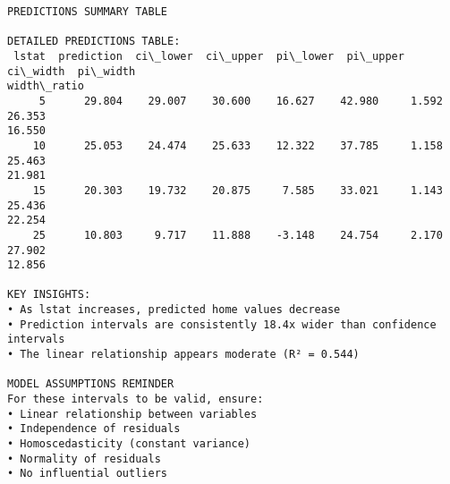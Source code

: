 \documentclass[8pt, twocolumn]{extarticle}
\begin{document}
    \centering
    \begin{Verbatim}[commandchars=\\\{\}]
PREDICTIONS SUMMARY TABLE

DETAILED PREDICTIONS TABLE:
 lstat  prediction  ci\_lower  ci\_upper  pi\_lower  pi\_upper  ci\_width  pi\_width
width\_ratio
     5      29.804    29.007    30.600    16.627    42.980     1.592    26.353
16.550
    10      25.053    24.474    25.633    12.322    37.785     1.158    25.463
21.981
    15      20.303    19.732    20.875     7.585    33.021     1.143    25.436
22.254
    25      10.803     9.717    11.888    -3.148    24.754     2.170    27.902
12.856

KEY INSIGHTS:
• As lstat increases, predicted home values decrease
• Prediction intervals are consistently 18.4x wider than confidence intervals
• The linear relationship appears moderate (R² = 0.544)

MODEL ASSUMPTIONS REMINDER
For these intervals to be valid, ensure:
• Linear relationship between variables
• Independence of residuals
• Homoscedasticity (constant variance)
• Normality of residuals
• No influential outliers
    \end{Verbatim}


    
    
    
\end{document}
